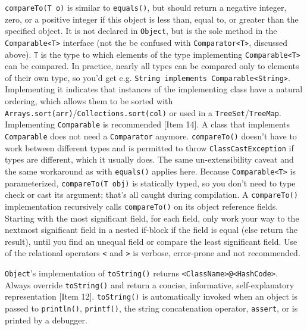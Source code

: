 \documentclass[8pt, table, xcdraw]{article}%
\begin{document}
\lstinline{compareTo(T o)} is similar to \lstinline{equals()}, but should return a negative integer, zero, or a positive integer if this object is less than, equal to, or greater than the specified object. It is not declared in \lstinline{Object}, but is the sole method in the \lstinline{Comparable<T>} interface (not the be confused with \lstinline{Comparator<T>}, discussed above). \lstinline{T} is the type to which elements of the type implementing \lstinline{Comparable<T>} can be compared. In practice, nearly all types can be compared only to elements of their own type, so you'd get e.g. \lstinline{String implements Comparable<String>}. Implementing it indicates that instances of the implementing class have a natural ordering, which allows them to be sorted with \lstinline{Arrays.sort(arr)}/\lstinline{Collections.sort(col)} or used in a \lstinline{TreeSet}/\lstinline{TreeMap}. Implementing \lstinline{Comparable} is recommended [Item 14]. A class that implements \lstinline{Comparable} does not need a \lstinline{Comparator} anymore. \lstinline{compareTo()} doesn't have to work between different types and is permitted to throw \lstinline{ClassCastException} if types are different, which it usually does. The same un-extensibility caveat and the same workaround as with \lstinline{equals()} applies here. Because \lstinline{Comparable<T>} is parameterized, \lstinline{compareTo(T obj)} is statically typed, so you don't need to type check or cast its argument; that's all caught during compilation. A \lstinline{compareTo()} implementation recursively calls \lstinline{compareTo()} on its object reference fields. Starting with the most significant field, for each field, only work your way to the nextmost significant field in a nested if-block if the field is equal (else return the result), until you find an unequal field or compare the least significant field. Use of the relational operators \lstinline{<} and \lstinline{>} is verbose, error-prone and not recommended.

\lstinline{Object}'s implementation of \lstinline{toString()} returns \lstinline{<ClassName>@<HashCode>}. Always override \lstinline{toString()} and return a concise, informative, self-explanatory representation [Item 12]. \lstinline{toString()} is automatically invoked when an object is passed to \lstinline{println()}, \lstinline{printf()}, the string concatenation operator, \lstinline{assert}, or is printed by a debugger.
\end{document}
